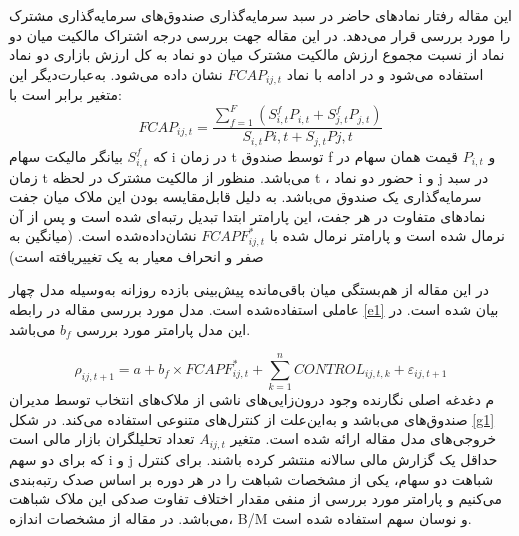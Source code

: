 \documentclass[12pt]{article}
\begin{document}
این مقاله رفتار نمادهای حاضر در سبد سرمایه‌گذاری صندوق‌های سرمایه‌گذاری مشترک 
را مورد بررسی قرار می‌دهد. در این مقاله جهت بررسی درجه اشتراک مالکیت میان دو نماد از نسبت مجموع ارزش  مالکیت مشترک میان دو نماد به کل ارزش بازاری دو نماد استفاده می‌شود و در ادامه با نماد
 $ FCAP_{ij,t} $ 
نشان داده می‌شود. به‌عبارت‌دیگر این متغیر برابر است با:
\begin{equation}
 FCAP_{ij,t} = \frac{\sum_{f = 1}^{F} (S^f_{i,t}P_{i,t}+S^f_{j,t}P_{j,t})}{S_{i,t}P{i,t} + S_{j,t}P{j,t}} 
 \label{e2}
\end{equation}
 که 
 $ S^f_{i,t} $
 بیانگر مالیکت سهام i در زمان t توسط صندوق f و
  $ P_{i,t}$
  قیمت همان سهام در زمان t می‌باشد. 
  منظور از مالکیت مشترک در لحظه t ، حضور دو نماد i و j در سبد سرمایه‌گذاری  یک صندوق می‌باشد. به دلیل قابل‌مقایسه بودن این ملاک میان جفت نمادهای متفاوت در هر جفت، این پارامتر ابتدا تبدیل رتبه‌ای
   شده است و پس از آن نرمال شده است و پارامتر نرمال شده با
 $ FCAPF^*_{ij,t} $ 
نشان‌داده‌شده است. (میانگین به صفر و انحراف معیار به یک تغییریافته است)
  
  در این مقاله از هم‌بستگی میان باقی‌مانده 
  پیش‌بینی بازده روزانه به‌وسیله  مدل چهار عاملی استفاده‌شده است.
   مدل مورد بررسی مقاله در رابطه 
  \ref{e1}
  بیان شده است. در این مدل پارامتر مورد بررسی
 $ b_f $ 
می‌باشد.

  
  \begin{equation}
  \rho_{ij,t+1} = a + b_f \times FCAPF^*_{ij,t} + \sum_{k = 1}^{n } CONTROL_{ij,t,k} + \varepsilon_{ij,t+1}
  \label{e1}
  \end{equation}
  م  دغدغه اصلی نگارنده وجود درون‌زایی‌های ناشی از ملاک‌های انتخاب توسط مدیران صندوق‌های می‌باشد و به‌این‌علت از کنترل‌های متنوعی استفاده می‌کند. در شکل 
    \ref{g1}
     خروجی‌های مدل مقاله ارائه شده است. متغیر 
     $ A_ {ij,t} $
    تعداد تحلیلگران بازار مالی است که برای دو سهم i و j حداقل یک گزارش مالی سالانه منتشر کرده باشند. 
    برای کنترل شباهت دو سهام، یکی از مشخصات شباهت را در هر دوره بر اساس صدک رتبه‌بندی می‌کنیم و پارامتر مورد بررسی از منفی مقدار اختلاف تفاوت صدکی این ملاک شباهت می‌باشد. در مقاله از مشخصات اندازه، B/M و نوسان سهم استفاده شده است.
  
\end{document}
